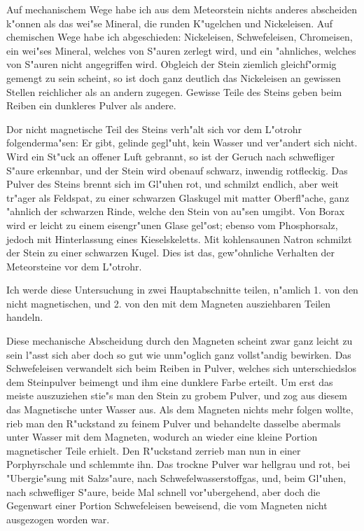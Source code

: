\documentclass[a4paper, 11pt, oneside]{article}
\begin{document}
Auf mechanischem Wege habe ich aus dem Meteorstein nichts anderes abscheiden k"onnen als das wei"se Mineral, die runden K"ugelchen und Nickeleisen. Auf chemischen Wege habe ich abgeschieden: Nickeleisen, Schwefeleisen, Chromeisen, ein wei"ses Mineral, welches von S"auren zerlegt wird, und ein "ahnliches, welches von S"auren nicht angegriffen wird. Obgleich der Stein ziemlich gleichf"ormig gemengt zu sein scheint, so ist doch ganz deutlich das Nickeleisen an gewissen Stellen reichlicher als an andern zugegen. Gewisse Teile des Steins geben beim Reiben ein dunkleres Pulver als andere.

Dor nicht magnetische Teil des Steins verh"alt sich vor dem L"otrohr folgenderma"sen: Er gibt, gelinde gegl"uht, kein Wasser und ver"andert sich nicht. Wird ein St"uck an offener Luft gebrannt, so ist der Geruch nach schwefliger S"aure erkennbar, und der Stein wird obenauf schwarz, inwendig rotfleckig. Das Pulver des Steins brennt sich im Gl"uhen rot, und schmilzt endlich, aber weit tr"ager als Feldspat, zu einer schwarzen Glaskugel mit matter Oberfl"ache, ganz "ahnlich der schwarzen Rinde, welche den Stein von au"sen umgibt. Von Borax wird er leicht zu einem eisengr"unen Glase gel"ost; ebenso vom Phosphorsalz, jedoch mit Hinterlassung eines Kieselskeletts. Mit kohlensaunen Natron schmilzt der Stein zu einer schwarzen Kugel. Dies ist das, gew"ohnliche Verhalten der Meteorsteine vor dem L"otrohr.

Ich werde diese Untersuchung in zwei Hauptabschnitte teilen, n"amlich 1. von den nicht magnetischen, und 2. von den mit dem Magneten ausziehbaren Teilen handeln.

Diese mechanische Abscheidung durch den Magneten scheint zwar ganz leicht zu sein l"asst sich aber doch so gut wie unm"oglich ganz vollst"andig bewirken. Das Schwefeleisen verwandelt sich beim Reiben in Pulver, welches sich unterschiedslos dem Steinpulver beimengt und ihm eine dunklere Farbe erteilt. Um erst das meiste auszuziehen stie"s man den Stein zu grobem Pulver, und zog aus diesem das Magnetische unter Wasser aus. Als dem Magneten nichts mehr folgen wollte, rieb man den R"uckstand zu feinem Pulver und behandelte dasselbe abermals unter Wasser mit dem Magneten, wodurch an wieder eine kleine Portion magnetischer Teile erhielt. Den R"uckstand zerrieb man nun in einer Porphyrschale und schlemmte ihn. Das trockne Pulver war hellgrau und rot, bei "Ubergie"sung mit Salzs"aure, nach Schwefelwasserstoffgas, und, beim Gl"uhen, nach schwefliger S"aure, beide Mal schnell vor"ubergehend, aber doch die Gegenwart einer Portion Schwefeleisen beweisend, die vom Magneten nicht ausgezogen worden war.
\end{document}

